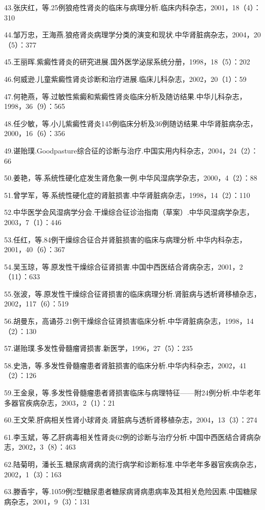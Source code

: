 43.张庆红，等.25例狼疮性肾炎的临床与病理分析.临床内科杂志，2001，18（4）：310

44.邹万忠，王海燕.狼疮肾炎病理学分类的演变和现状.中华肾脏病杂志，2004，20（5）：377

45.王丽晖.紫癜性肾炎的研究进展.国外医学泌尿系统分册，1998，18（5）：202

46.何威逊.儿童紫癜性肾炎诊断和治疗进展.临床儿科杂志，2002，20（1）：59

47.何艳燕，等.过敏性紫癜和紫癜性肾炎临床分析及随访结果.中华儿科杂志，1998，36（9）：565

48.任少敏，等.小儿紫癜性肾炎145例临床分析及36例随访结果.中华肾脏病杂志，2000，16（6）：356

49.谌贻璞.Goodpasture综合征的诊断与治疗.中国实用内科杂志，2004，24（2）：66

50.姜艳，等.系统性硬化症发生肾危象一例.中华风湿病学杂志，2000，4（2）：88

51.曾学军，等.系统性硬化症的肾脏损害.中华肾脏病杂志，1998，14（2）：110

52.中华医学会风湿病学分会.干燥综合征诊治指南（草案）.中华风湿病学杂志，2003，7（1）：446

53.任红，等.84例干燥综合征合并肾脏损害的临床与病理分析.中华内科杂志，2001，40（6）：367

54.吴玉琼，等.原发性干燥综合征肾损害.中国中西医结合肾病杂志，2001，2（11）：633

55.张波，等.原发性干燥综合征肾损害的临床病理分析.肾脏病与透析肾移植杂志，2002，117（6）：519

56.胡曼东，高诵芬.21例干燥综合征肾损害临床分析.中华肾脏病杂志，1998，14（2）：130

57.谌贻璞.多发性骨髓瘤肾损害.新医学，1996，27（5）：235

58.史浩，等.多发性骨髓瘤患者肾脏损害的临床分析.中华内科杂志，2002，41（2）：126

59.王金泉，等.多发性骨髓瘤患者肾损害临床与病理特征------附24例分析.中华老年多器官疾病杂志，2003，2（1）：21

60.王文荣.肝病相关性肾小球肾炎.肾脏病与透析肾移植杂志，2004，13（3）：274

61.李玉斌，等.乙肝病毒相关性肾炎62例的诊断与治疗分析.中国中西医结合肾病杂志，2002，3（8）：463

62.陆菊明，潘长玉.糖尿病肾病的流行病学和诊断标准.中华老年多器官疾病杂志，2002，1（3）：163

63.滕香宇，等.1059例2型糖尿患者糖尿病肾病患病率及其相关危险因素.中国糖尿病杂志，2001，9（3）：131

